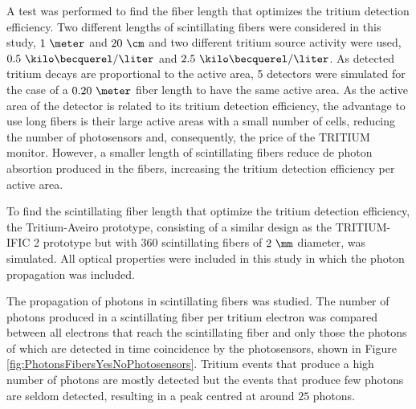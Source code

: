 A test was performed to find the fiber length that optimizes the tritium detection efficiency. Two different lengths of scintillating fibers were considered in this study, $1~\meter$ and $20~\cm$ and two different tritium source activity were used, $0.5~\kilo\becquerel/\liter$ and $2.5~\kilo\becquerel/\liter$. As detected tritium decays are proportional to the active area, 5 detectors were simulated for the case of a $0.20~\meter$ fiber length to have the same active area. As the active area of the detector is related to its tritium detection efficiency, the advantage to use long fibers is their large active areas with a small number of cells, reducing the number of photosensors and, consequently, the price of the TRITIUM monitor. However, a smaller length of scintillating fibers reduce de photon absortion produced in the fibers, increasing the tritium detection efficiency per active area.

To find the scintillating fiber length that optimize the tritium detection efficiency, the Tritium-Aveiro prototype, consisting of a similar design as the TRITIUM-IFIC 2 prototype but with $360$ scintillating fibers of $2~\mm$ diameter, was simulated. All optical properties were included in this study in which the photon propagation was included.

The propagation of photons in scintillating fibers was studied. The number of photons produced in a scintillating fiber per tritium electron was compared between all electrons that reach the scintillating fiber and only those the photons of which are detected in time coincidence by the photosensors, shown in Figure \ref{fig:PhotonsFibersYesNoPhotosensors}. Tritium events that produce a high number of photons are mostly detected but the events that produce few photons are seldom detected, resulting in a peak centred at around $25$ photons.  

